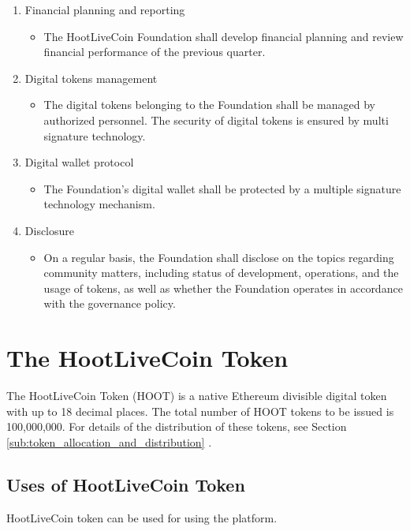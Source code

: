 \documentclass{article}
\begin{document}
\begin{enumerate}
 \item Financial planning and reporting
 \begin{itemize}
 \item The HootLiveCoin Foundation shall develop financial planning and review financial performance of the previous quarter.
 \end{itemize}

 \item Digital tokens management
 \begin{itemize}
 \item The digital tokens belonging to the Foundation shall be managed by authorized personnel. The security of digital tokens is ensured by multi signature technology.
 \end{itemize}

 \item Digital wallet protocol
 \begin{itemize}
 \item The Foundation’s digital wallet shall be protected by a multiple signature technology mechanism.
 \end{itemize}

 \item Disclosure
 \begin{itemize}
 \item On a regular basis, the Foundation shall disclose on the topics regarding community matters, including status of development, operations, and the usage of tokens, as well as whether the Foundation operates in accordance with the governance policy.
 \end{itemize}
\end{enumerate}


\section{The HootLiveCoin Token}
The HootLiveCoin Token (HOOT) is a native Ethereum divisible digital token with up to 18 decimal places. The total number of HOOT tokens to be issued is 100,000,000. For details of the distribution of these tokens, see Section \ref{sub:token_allocation_and_distribution} .

\subsection{Uses of HootLiveCoin Token} %
\label{sub:uses_of_hoot_token}
HootLiveCoin token can be used for using the platform.
\end{document}
